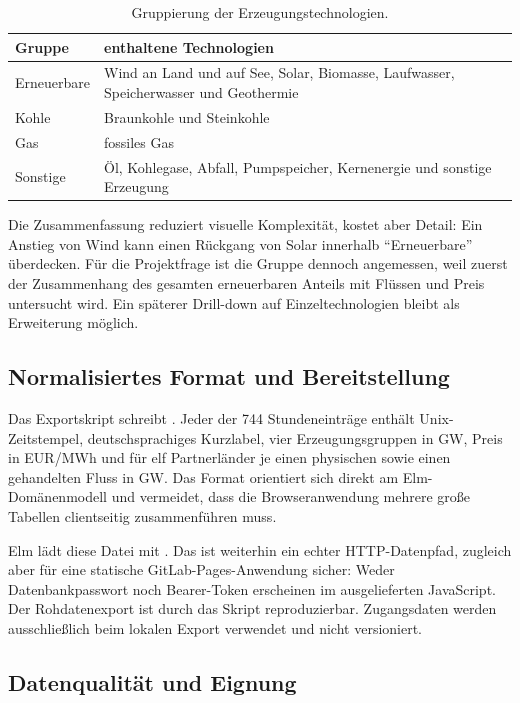 \begin{table}[htbp]
  \centering
  \caption{Gruppierung der Erzeugungstechnologien.}
  \label{tab:generation}
  \begin{tabularx}{\textwidth}{@{}lX@{}}
    \toprule
    Gruppe & enthaltene Technologien \\
    \midrule
    Erneuerbare & Wind an Land und auf See, Solar, Biomasse, Laufwasser,
      Speicherwasser und Geothermie \\
    Kohle & Braunkohle und Steinkohle \\
    Gas & fossiles Gas \\
    Sonstige & Öl, Kohlegase, Abfall, Pumpspeicher, Kernenergie und sonstige
      Erzeugung \\
    \bottomrule
  \end{tabularx}
\end{table}

Die Zusammenfassung reduziert visuelle Komplexität, kostet aber Detail: Ein
Anstieg von Wind kann einen Rückgang von Solar innerhalb ``Erneuerbare''
überdecken. Für die Projektfrage ist die Gruppe dennoch angemessen, weil zuerst
der Zusammenhang des gesamten erneuerbaren Anteils mit Flüssen und Preis
untersucht wird. Ein späterer Drill-down auf Einzeltechnologien bleibt als
Erweiterung möglich.

\subsection*{Normalisiertes Format und Bereitstellung}

Das Exportskript schreibt . Jeder der 744
Stundeneinträge enthält Unix-Zeitstempel, deutschsprachiges Kurzlabel, vier
Erzeugungsgruppen in GW, Preis in EUR/MWh und für elf Partnerländer je einen
physischen sowie einen gehandelten Fluss in GW. Das Format orientiert sich
direkt am Elm-Domänenmodell und vermeidet, dass die Browseranwendung mehrere
gro{\ss}e Tabellen clientseitig zusammenführen muss.

Elm lädt diese Datei mit . Das ist weiterhin ein echter
HTTP-Datenpfad, zugleich aber für eine statische GitLab-Pages-Anwendung sicher:
Weder Datenbankpasswort noch Bearer-Token erscheinen im ausgelieferten
JavaScript. Der Rohdatenexport ist durch das Skript reproduzierbar.
Zugangsdaten werden ausschlie{\ss}lich beim lokalen Export verwendet und nicht
versioniert.

\subsection*{Datenqualität und Eignung}

